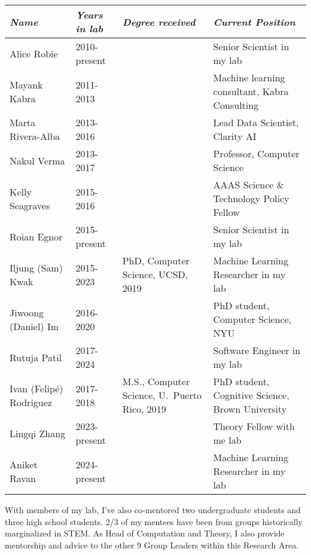 \documentclass[11pt, letterpaper]{awesome-cv}
\begin{document}
\begingroup
\begin{center}
\fontsize{10pt}{1em}\bodyfont\upshape\selectfont
\setlength{\tabcolsep}{6pt}
\begin{tabular}{ll>{\raggedright\arraybackslash}p{2in}>{\raggedright\arraybackslash}p{2.5in}}
\hline
  {\em Name} & {\em Years in lab} & {\em Degree received} & {\em Current Position} \\\hline\hline
  Alice Robie & 2010-present & & Senior Scientist in my lab \\
  Mayank Kabra & 2011-2013 & & Machine learning consultant, Kabra Consulting \\
  Marta Rivera-Alba & 2013-2016& & Lead Data Scientist, Clarity AI\\
  Nakul Verma & 2013-2017 & & Professor, Computer Science\\
  Kelly Seagraves & 2015-2016 & & AAAS Science \& Technology Policy Fellow\\
  Roian Egnor & 2015-present & & Senior Scientist in my lab\\
  Iljung (Sam) Kwak & 2015-2023 & PhD, Computer Science, UCSD, 2019 & Machine Learning Researcher in my lab\\
  Jiwoong (Daniel) Im & 2016-2020 & & PhD student, Computer Science, NYU\\
  Rutuja Patil & 2017-2024 & & Software Engineer in my lab\\
  Ivan (Felip\'e) Rodriguez & 2017-2018 & M.S., Computer Science, U.~Puerto Rico, 2019 & PhD student, Cognitive Science, Brown University \\
  Lingqi Zhang & 2023-present & & Theory Fellow with me lab \\
  Aniket Ravan & 2024-present & & Machine Learning Researcher in my lab \\\hline
\end{tabular}
\end{center}
\endgroup

\vspace{.25cm}
With members of my lab, I've also co-mentored two undergraduate students and three high school students. 2/3 of my mentees have been from groups historically marginalized in STEM. As Head of Computation and Theory, I also provide mentorship and advice to the other 9 Group Leaders within this Research Area. 
\vspace{\acvSectionContentTopSkip}
\end{document}
